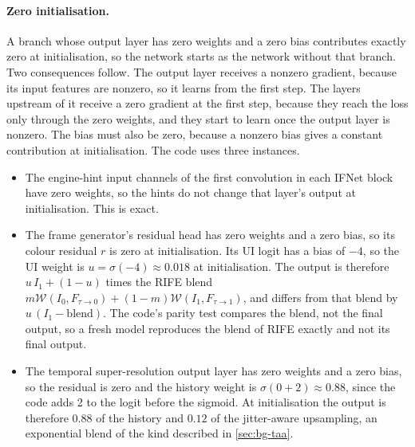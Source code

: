 \paragraph{Zero initialisation.} A branch whose output layer has zero weights and a zero bias contributes exactly zero at initialisation, so the network starts as the network without that branch. Two consequences follow. The output layer receives a nonzero gradient, because its input features are nonzero, so it learns from the first step. The layers upstream of it receive a zero gradient at the first step, because they reach the loss only through the zero weights, and they start to learn once the output layer is nonzero. The bias must also be zero, because a nonzero bias gives a constant contribution at initialisation. The code uses three instances.
\begin{itemize}
\item The engine-hint input channels of the first convolution in each IFNet block have zero weights, so the hints do not change that layer's output at initialisation. This is exact.
\item The frame generator's residual head has zero weights and a zero bias, so its colour residual $r$ is zero at initialisation. Its UI logit has a bias of $-4$, so the UI weight is $u=\sigma(-4)\approx0.018$ at initialisation. The output is therefore $u\,I_1+(1-u)$ times the RIFE blend $m\mathcal W(I_0,F_{\tau\to0})+(1-m)\mathcal W(I_1,F_{\tau\to1})$, and differs from that blend by $u\,(I_1-\text{blend})$. The code's parity test compares the blend, not the final output, so a fresh model reproduces the blend of RIFE exactly and not its final output.
\item The temporal super-resolution output layer has zero weights and a zero bias, so the residual is zero and the history weight is $\sigma(0+2)\approx0.88$, since the code adds 2 to the logit before the sigmoid. At initialisation the output is therefore $0.88$ of the history and $0.12$ of the jitter-aware upsampling, an exponential blend of the kind described in \cref{sec:bg-taa}.
\end{itemize}

